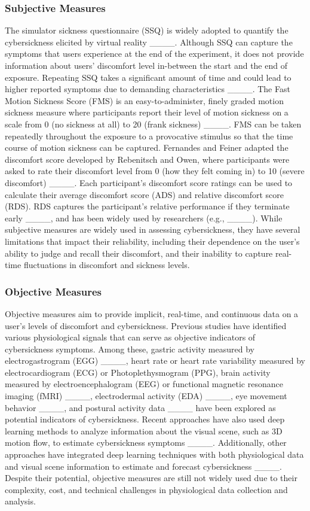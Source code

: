 \subsubsection{Subjective Measures}
The simulator sickness questionnaire (SSQ) is widely adopted to quantify the cybersickness elicited by virtual reality ____. 
Although SSQ can capture the symptoms that users experience at the end of the experiment, it does not provide information about users' discomfort level in-between the start and the end of exposure.
Repeating SSQ takes a significant amount of time and could lead to higher reported symptoms due to demanding characteristics ____.
The Fast Motion Sickness Score (FMS) is an easy-to-administer, finely graded motion sickness measure where participants report their level of motion sickness on a scale from 0 (no sickness at all) to 20 (frank sickness) ____. 
FMS can be taken repeatedly throughout the exposure to a provocative stimulus so that the time course of motion sickness can be captured.
Fernandes and Feiner adapted the discomfort score developed by Rebenitsch and Owen, where participants were asked to rate their discomfort level from 0 (how they felt coming in) to 10 (severe discomfort) ____. 
Each participant's discomfort score ratings can be used to calculate their average discomfort score (ADS) and relative discomfort score (RDS).
RDS captures the participant's relative performance if they terminate early ____, and has been widely used by researchers (e.g., ____). While subjective measures are widely used in assessing cybersickness, they have several limitations that impact their reliability, including their dependence on the user's ability to judge and recall their discomfort, and their inability to capture real-time fluctuations in discomfort and sickness levels.


\subsubsection{Objective Measures}
Objective measures aim to provide implicit, real-time, and continuous data on a user's levels of discomfort and cybersickness.  
Previous studies have identified various physiological signals that can serve as objective indicators of cybersickness symptoms. 
Among these, gastric activity measured by electrogastrogram (EGG) ____, 
heart rate or heart rate variability measured by electrocardiogram (ECG) or Photoplethysmogram (PPG), 
brain activity measured by electroencephalogram (EEG) or functional magnetic resonance imaging (fMRI) ____, %
electrodermal activity (EDA) ____,   
eye movement behavior ____,  
and postural activity data 
____
have been explored as potential indicators of cybersickness.
Recent approaches have also used deep learning methods to analyze information about the visual scene, such as 3D motion flow, to estimate cybersickness symptoms ____. 
Additionally, other approaches have integrated deep learning techniques with both physiological data and visual scene information to estimate and forecast cybersickness ____.
Despite their potential, objective measures are still not widely used due to their complexity, cost, and technical challenges in physiological data collection and analysis.


